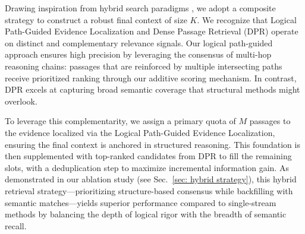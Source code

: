 Drawing inspiration from hybrid search paradigms \cite{bhagdev2008hybrid, wang2025balancing}, we adopt a composite strategy to construct a robust final context of size $K$. We recognize that Logical Path-Guided Evidence Localization and Dense Passage Retrieval (DPR) operate on distinct and complementary relevance signals. Our logical path-guided approach ensures high precision by leveraging the consensus of multi-hop reasoning chains: passages that are reinforced by multiple intersecting paths receive prioritized ranking through our additive scoring mechanism. In contrast, DPR excels at capturing broad semantic coverage that structural methods might overlook.

To leverage this complementarity, we assign a primary quota of $M$ passages to the evidence localized via the Logical Path-Guided Evidence Localization, ensuring the final context is anchored in structured reasoning. This foundation is then supplemented with top-ranked candidates from DPR to fill the remaining slots, with a deduplication step to maximize incremental information gain. As demonstrated in our ablation study (see Sec.~\ref{sec: hybrid strategy}), this hybrid retrieval strategy—prioritizing structure-based consensus while backfilling with semantic matches—yields superior performance compared to single-stream methods by balancing the depth of logical rigor with the breadth of semantic recall.